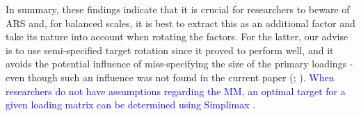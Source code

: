 \documentclass[a4paper,man,natbib]{apa6}
\begin{document}
\begin{linenumbers}

In summary, these findings indicate that it is crucial for researchers to beware of ARS and, for balanced scales, it is best to extract this as an additional factor and take its nature into account when rotating the factors. For the latter, our advise is to use semi-specified target rotation since it proved to perform well, and it avoids the potential influence of miss-specifying the size of the primary loadings - even though such an influence was not found in the current paper (\citealp{myers2013rotation}; \citealp{myers2015rotation}).  \label{refpage:R1Mj1a}\textcolor{blue}{When researchers do not have assumptions regarding the MM, an optimal target for a given loading matrix can be determined using Simplimax \citep{kiers1994simplimax}.}





\end{linenumbers}
\end{document}
